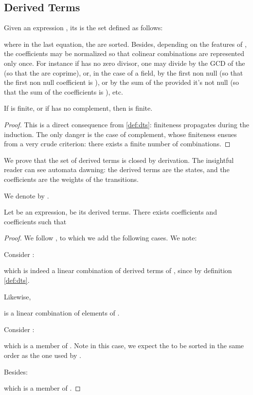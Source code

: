 \documentclass[a4paper,USenglish]{lipics}
\begin{document}
\subsection{Derived Terms}
\label{sec:der-terms}
\begin{Definition}
  \label{def:dts}
  Given an expression , its  is the set 
  defined as follows:
  
  \noindent where in the last equation, the  are sorted.  Besides,
  depending on the features of , the coefficients may be normalized so
  that colinear combinations are represented only once.  For instance if
   has no zero divisor, one may divide by the GCD of the  (so that
  the  are coprime), or, in the case of a field, by the first non null
   (so that the first non null coefficient is ), or by the sum of
  the  provided it's not null (so that the sum of the coefficients is
  ), etc.
\end{Definition}

\begin{theorem}
  If  is finite, or if  has no complement, then  is finite.
\end{theorem}

\begin{proof}
  This is a direct consequence from \cref{def:dts}: finiteness propagates
  during the induction.  The only danger is the case of complement, whose
  finiteness ensues from a very crude criterion: there exists a finite
  number of combinations.
\end{proof}


We prove that the set of derived terms is closed by derivation.  The
insightful reader can see automata dawning: the derived terms are the
states, and the coefficients are the weights of the transitions.
\begin{Lemma}
  \label{lem:dt:closed:letter}
  We denote  by .

  Let  be an expression,  be its
  derived terms.  There exists  coefficients  and
   coefficients  such that
  
\end{Lemma}

\begin{proof}
  We follow \citep[proof of Theorem~2]{lombardy.2005.tcs}, to which we add
  the following cases.  We note:
  

  Consider :
  
  which is indeed a linear combination of derived terms of ,
  since
   by definition \cref{def:dts}.

  Likewise,
  
  is a linear combination of elements of .

  Consider :
  
  which is a member of .  Note in this case, we expect the 
  to be sorted in the same order as the one used by .

  Besides:
  
  which is a member of .
\end{proof}
\end{document}

